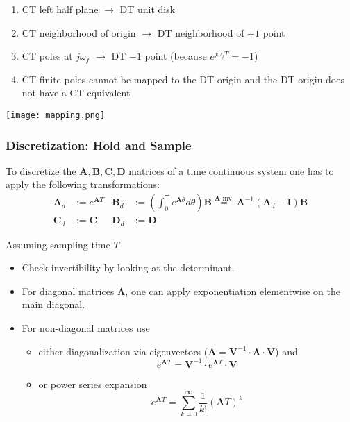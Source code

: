 \begin{enumerate}
    \item CT left half plane $\rightarrow$ DT unit disk
    \item CT neighborhood of origin $\rightarrow$ DT neighborhood of $+1$ point
    \item CT poles at $j\omega_f$ $\rightarrow$ DT $-1$ point (because $e^{j\omega_{f}T}=-1$)
    \item CT finite poles cannot be mapped to the DT origin and the DT origin does not have a CT equivalent
\end{enumerate}

\begin{center}
    \texttt{[image: mapping.png]}
\end{center}


\subsubsection{Discretization: Hold and Sample}\label{disc::hold_and_sample}

To discretize the $\mathbf{A}, \mathbf{B}, \mathbf{C}, \mathbf{D}$ matrices of a time continuous system one has to apply the following transformations:
\begin{align*}
    \mathbf{A}_d & :=e^{\mathbf{A}T} & \mathbf{B}_d & :=\left(\int_0^{\mathsf{T}} {e^{\mathbf{A}\theta}}d\theta\right)\mathbf{B} \overset{\mathbf{A} \text{ inv.}}{=} \mathbf{A}^{-1}\left(\mathbf{A}_d-\mathbf{I}\right)\mathbf{B} \\
    \mathbf{C}_d & :=\mathbf{C}      & \mathbf{D}_d & :=\mathbf{D}
\end{align*}

\newpar{}

Assuming sampling time $T$
\begin{itemize}
    \item Check invertibility by looking at the determinant.
    \item For diagonal matrices $\boldsymbol{\Lambda}$, one can apply exponentiation elementwise on the main diagonal.
    \item For non-diagonal matrices use
          \begin{itemize}
              \item either diagonalization via eigenvectors ($\mathbf{A}=\mathbf{V}^{-1}\cdot \boldsymbol{\Lambda} \cdot \mathbf{V}$) and
                    \begin{equation*}
                        e^{\mathbf{A}T} = \mathbf{V}^{-1}\cdot e^{\boldsymbol{\Lambda} T} \cdot \mathbf{V}
                    \end{equation*}
              \item or power series expansion
                    \begin{equation*}
                        e^{\mathbf{A}T}=\sum_{k=0}^{\infty}\frac{1}{k!}{\left(\mathbf{A}T\right)}^k
                    \end{equation*}
          \end{itemize}
\end{itemize}

